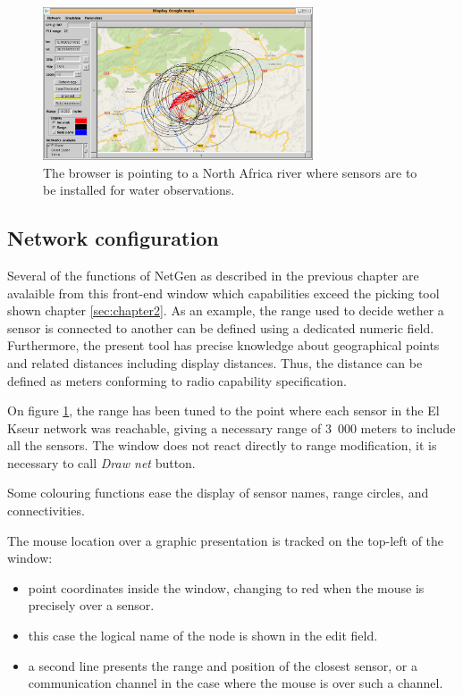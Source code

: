 \begin{figure}
\begin{center}
\includegraphics[width=8cm]{soummam1.png}
\caption{The browser is pointing to a North Africa river where sensors are to be installed
for water observations.}
\label{fig:soummam1}
\end{center}
\end{figure}

\subsection{Network configuration}

Several of the functions of NetGen as described in the previous chapter are avalaible from 
this front-end window which capabilities exceed the picking tool shown 
chapter \ref{sec:chapter2}. As an example, the range used to decide wether a sensor 
is connected to another can be defined using a dedicated numeric field. Furthermore, 
the present tool has precise knowledge about geographical points and related distances 
including display distances. Thus, the distance can be defined as meters conforming to 
radio capability specification. 

On figure \ref{fig:soummam1}, the range has been tuned to the point where each sensor 
in the El Kseur network was reachable, giving a necessary range of 3~000 meters to include 
all the sensors. The window does not react directly to range modification, 
it is necessary to call \emph{Draw net} button. 

Some colouring functions ease the display of sensor names, range circles, and connectivities. 

The mouse location over a graphic presentation is tracked on the top-left 
of the window: 

\begin{itemize}
\item point coordinates inside the window, changing to red when the mouse is precisely over 
  a sensor. 
\item this case the logical name of the node is shown in the edit field.
\item a second line presents the range and position of the closest sensor, 
or a communication channel in the case where the mouse is over such a channel.
\end{itemize}


